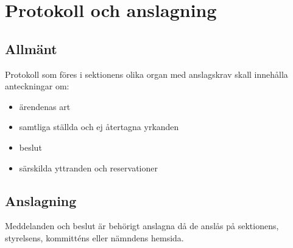 \section{Protokoll och anslagning}

\subsection{Allmänt}
Protokoll som föres i sektionens olika organ med anslagskrav skall innehålla anteckningar om:
\begin{itemize}
	\item ärendenas art
	\item samtliga ställda och ej återtagna yrkanden
	\item beslut
	\item särskilda yttranden och reservationer
\end{itemize}

\subsection{Anslagning}
\label{sec:protokoll:anslagning}
Meddelanden och beslut är behörigt anslagna då de anslås på sektionens, styrelsens, kommitténs eller nämndens hemsida.
